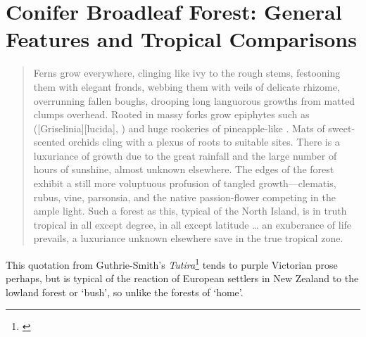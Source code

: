\chapter{Conifer Broadleaf Forest: General Features and Tropical Comparisons}%
\label{ch:conifergeneral}

\begin{quote}
	Ferns grow everywhere, clinging like ivy to the rough stems, festooning them with elegant fronds, webbing them with veils of delicate rhizome, overrunning fallen boughs, drooping long languorous growths from matted clumps overhead.
	Rooted in massy forks grow epiphytes such as  ([Griselinia][lucida], ) and huge rookeries of pineapple-like .
	Mats of sweet-scented orchids cling with a plexus of roots to suitable sites.
	There is a luxuriance of growth due to the great rainfall and the large number of hours of sunshine, almost unknown elsewhere.
	The edges of the forest exhibit a still more voluptuous profusion of tangled growth---clematis, rubus, vine, parsonsia, and the native passion-flower competing in the ample light.
	Such a forest as this, typical of the North Island, is in truth tropical in all except degree, in all except latitude … an exuberance of life prevails, a luxuriance unknown elsewhere save in the true tropical zone.
\end{quote}

This quotation from  Guthrie-Smith's \emph{Tutira}\footnote{\cite{guthriesmith1926tutira}} tends to purple Victorian prose perhaps, but is typical of the reaction of European settlers in New Zealand to the lowland forest or `bush', so unlike the forests of `home'.

